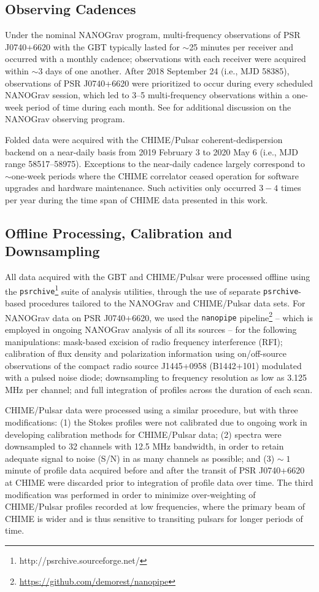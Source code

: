 \documentclass[twocolumn]{aastex63}
\newcommand{\chimepsr}{CHIME/Pulsar}
\newcommand{\nanopipe}{{\tt nanopipe}}
\newcommand{\psrchive}{{\tt psrchive}}
\begin{document}
\subsection{Observing Cadences}
Under the nominal NANOGrav program, multi-frequency observations of PSR J0740+6620 with the GBT typically lasted for $\sim$25 minutes per receiver and occurred with a monthly cadence; observations with each receiver were acquired within $\sim$3 days of one another. After 2018 September 24 (i.e., MJD 58385), observations of PSR J0740+6620 were prioritized to occur during every scheduled NANOGrav session, which led to 3--5 multi-frequency observations within a one-week period of time during each month. See \citet{aab+21a,aab+21b} for additional discussion on the NANOGrav observing program.

Folded data were acquired with the \chimepsr{} coherent-dedispersion backend on a near-daily basis from 2019 February 3 to 2020 May 6 (i.e., MJD range 58517--58975). Exceptions to the near-daily cadence largely correspond to $\sim$one-week periods where the CHIME correlator ceased operation for software upgrades and hardware maintenance. Such activities only occurred $3-4$ times per year during the time span of CHIME data presented in this work.

\subsection{Offline Processing, Calibration and Downsampling}
All data acquired with the GBT and \chimepsr{} were processed offline using the \psrchive{}\footnote{http://psrchive.sourceforge.net/} suite of analysis utilities, through the use of separate \psrchive-based procedures tailored to the NANOGrav and \chimepsr{} data sets. For NANOGrav data on PSR J0740+6620, we used the \nanopipe{} pipeline\footnote{\url{https://github.com/demorest/nanopipe}} -- which is employed in ongoing NANOGrav analysis of all its sources -- for the following manipulations: mask-based excision of radio frequency interference (RFI); calibration of flux density and polarization information using on/off-source observations of the compact radio source J1445+0958 (B1442+101) modulated with a pulsed noise diode; downsampling to frequency resolution as low as 3.125 MHz per channel; and full integration of profiles across the duration of each scan. 

\chimepsr{} data were processed using a similar procedure, but with three modifications: (1) the Stokes profiles were not calibrated due to ongoing work in developing calibration methods for \chimepsr{} data; (2) spectra were downsampled to 32 channels with 12.5 MHz bandwidth, in order to retain adequate signal to noise (S/N) in as many channels as possible; and (3) $\sim\;1$ minute of profile data acquired before and after the transit of PSR J0740+6620 at CHIME were discarded prior to integration of profile data over time. The third modification was performed in order to minimize over-weighting of \chimepsr{} profiles recorded at low frequencies, where the primary beam of CHIME is wider and is thus sensitive to transiting pulsars for longer periods of time.
\end{document}
